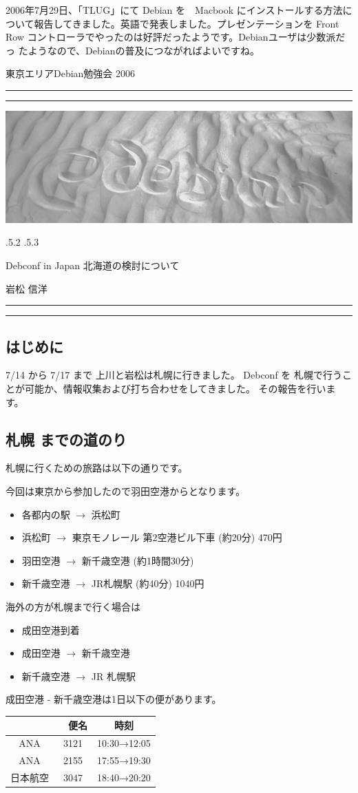 \documentclass[mingoth,a4paper]{jsarticle}
\makeatletter
\renewcommand{\section}{\@startsection{section}{1}{\z@}%
    {\Cvs \@plus.5\Cdp \@minus.2\Cdp}%
    {.5\Cvs \@plus.3\Cdp}%
    {\normalfont\Huge\headfont\raggedright\centering}} %
\newcommand{\dancersection}[2]{%
\newpage
東京エリアDebian勉強会 2006
\hrule
\vspace{0.5mm}
\hrule
\includegraphics[width=16cm]{image2006-natsu/guruguru-sand-light.png}\\
\vspace{-5cm}
\begin{center}
\section{#1}
\end{center}
\hfill{}\colorbox{white}{#2}\hspace{3cm}\space\\
\vspace{1cm}
\hrule
\vspace{0.5mm}
\hrule
\vspace{1cm}
}
\makeatother
\begin{document}
2006年7月29日、「TLUG」にて Debian を　Macbook にインストールする方法に
ついて報告してきました。英語で発表しました。プレゼンテーションを Front
Row コントローラでやったのは好評だったようです。Debianユーザは少数派だっ
たようなので、Debianの普及につながればよいですね。

\dancersection{Debconf in Japan 北海道の検討について}{岩松 信洋}
\label{sec:iwamatsudebconf}

\subsection{はじめに}

	7/14 から 7/17 まで 上川と岩松は札幌に行きました。
	Debconf を 札幌で行うことが可能か、情報収集および打ち合わせをしてきました。
	その報告を行います。

\subsection{札幌 までの道のり	}
札幌に行くための旅路は以下の通りです。

今回は東京から参加したので羽田空港からとなります。

\begin{itemize}
 \item       各都内の駅 $\rightarrow$  浜松町
 \item       浜松町  $\rightarrow$ 東京モノレール 第2空港ビル下車 (約20分) 470円
 \item       羽田空港  $\rightarrow$ 新千歳空港 (約1時間30分)
 \item       新千歳空港  $\rightarrow$ JR札幌駅 (約40分) 1040円
\end{itemize}

海外の方が札幌まで行く場合は

\begin{itemize}
 \item      成田空港到着
 \item       成田空港  $\rightarrow$ 新千歳空港
 \item       新千歳空港   $\rightarrow$ JR 札幌駅
\end{itemize}

     成田空港 - 新千歳空港は1日以下の便があります。

\begin{tabular}[t]{|cc|c|}
\hline
\hline
 &　便名 & 時刻 \\
\hline
      ANA	&	3121 &	10:30→12:05 	  \\
     ANA	&	2155 &	17:55→19:30 	 \\
     日本航空&	3047	&18:40→20:20  \\
\hline
\end{tabular}
 	 
\end{document}
